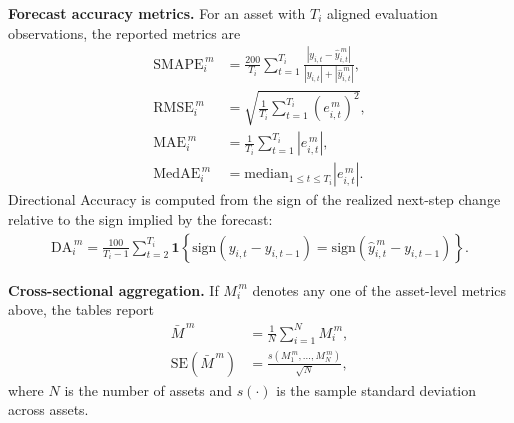 \documentclass[11pt,a4paper]{article}
\begin{document}
\vspace{0.15cm}
\noindent \textbf{Forecast accuracy metrics.}
For an asset with $T_i$ aligned evaluation observations, the reported metrics are
\begin{align*}
\mathrm{SMAPE}^{\,m}_i &= \frac{200}{T_i}\sum_{t=1}^{T_i}\frac{|y_{i,t}-\hat{y}^{\,m}_{i,t}|}{|y_{i,t}|+|\hat{y}^{\,m}_{i,t}|},\\
\mathrm{RMSE}^{\,m}_i &= \sqrt{\frac{1}{T_i}\sum_{t=1}^{T_i}\left(e^{\,m}_{i,t}\right)^2},\\
\mathrm{MAE}^{\,m}_i &= \frac{1}{T_i}\sum_{t=1}^{T_i}\left|e^{\,m}_{i,t}\right|,\\
\mathrm{MedAE}^{\,m}_i &= \mathrm{median}_{1 \leq t \leq T_i}\left|e^{\,m}_{i,t}\right|.
\end{align*}
Directional Accuracy is computed from the sign of the realized next-step change relative to the sign implied by the forecast:
\begin{align*}
\mathrm{DA}^{\,m}_i
= \frac{100}{T_i-1}\sum_{t=2}^{T_i}
\mathbf{1}\!\left\{
\mathrm{sign}(y_{i,t}-y_{i,t-1})
=
\mathrm{sign}(\hat{y}^{\,m}_{i,t}-y_{i,t-1})
\right\}.
\end{align*}

\vspace{0.15cm}
\noindent \textbf{Cross-sectional aggregation.}
If $M_i^{\,m}$ denotes any one of the asset-level metrics above, the tables report
\begin{align*}
\bar{M}^{\,m} &= \frac{1}{N}\sum_{i=1}^{N} M_i^{\,m},\\
\mathrm{SE}\!\left(\bar{M}^{\,m}\right) &= \frac{s(M_1^{\,m},\ldots,M_N^{\,m})}{\sqrt{N}},
\end{align*}
where $N$ is the number of assets and $s(\cdot)$ is the sample standard deviation across assets.
\end{document}
